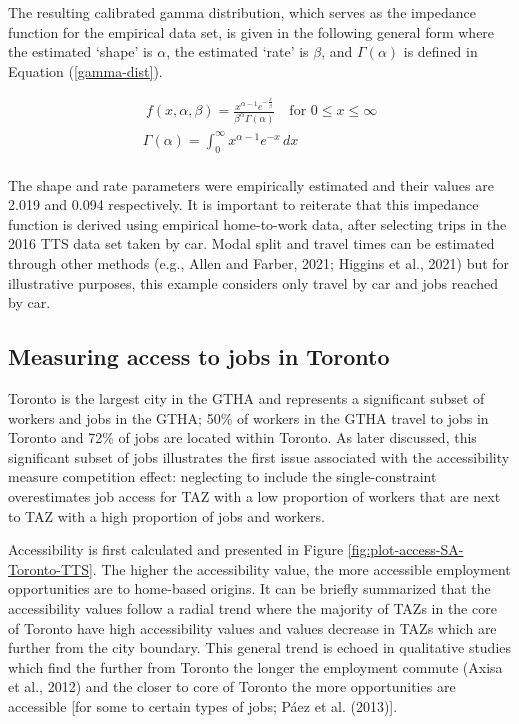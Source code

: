 \documentclass[]{elsarticle} %
\begin{document}
The resulting calibrated gamma distribution, which serves as the
impedance function for the empirical data set, is given in the following
general form where the estimated `shape' is \(\alpha\), the estimated
`rate' is \(\beta\), and \(\Gamma(\alpha)\) is defined in Equation
(\ref{gamma-dist}).

\begin{equation}
\label{gamma-dist}
\begin{array}{l}\ 
f(x, \alpha, \beta) = \frac {x^{\alpha-1}e^{-\frac{x}{\beta}}}{ \beta^{\alpha}\Gamma(\alpha)} \quad \text{for } 0 \leq x \leq \infty\\

\Gamma(\alpha) =  \int_{0}^{\infty} x^{\alpha-1}e^{-x} \,dx\\
\end{array}
\end{equation}

The shape and rate parameters were empirically estimated and their
values are 2.019 and 0.094 respectively. It is important to reiterate
that this impedance function is derived using empirical home-to-work
data, after selecting trips in the 2016 TTS data set taken by car. Modal
split and travel times can be estimated through other methods (e.g.,
Allen and Farber, 2021; Higgins et al., 2021) but for illustrative
purposes, this example considers only travel by car and jobs reached by
car.

\hypertarget{measuring-access-to-jobs-in-toronto}{%
\subsection{Measuring access to jobs in
Toronto}\label{measuring-access-to-jobs-in-toronto}}

Toronto is the largest city in the GTHA and represents a significant
subset of workers and jobs in the GTHA; 50\% of workers in the GTHA
travel to jobs in Toronto and 72\% of jobs are located within Toronto.
As later discussed, this significant subset of jobs illustrates the
first issue associated with the accessibility measure competition
effect: neglecting to include the single-constraint overestimates job
access for TAZ with a low proportion of workers that are next to TAZ
with a high proportion of jobs and workers.

Accessibility is first calculated and presented in Figure
\ref{fig:plot-access-SA-Toronto-TTS}. The higher the accessibility
value, the more accessible employment opportunities are to home-based
origins. It can be briefly summarized that the accessibility values
follow a radial trend where the majority of TAZs in the core of Toronto
have high accessibility values and values decrease in TAZs which are
further from the city boundary. This general trend is echoed in
qualitative studies which find the further from Toronto the longer the
employment commute (Axisa et al., 2012) and the closer to core of
Toronto the more opportunities are accessible {[}for some to certain
types of jobs; Páez et al. (2013){]}.
\end{document}
